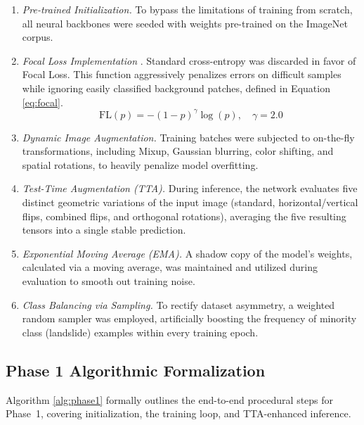\documentclass[12pt,a4paper]{report}
\begin{document}
\begin{enumerate}
    \item \textit{Pre-trained Initialization.} To bypass the limitations of training from scratch, all neural backbones were seeded with weights pre-trained on the ImageNet corpus.
    \item \textit{Focal Loss Implementation} \cite{lin2017focal}. Standard cross-entropy was discarded in favor of Focal Loss. This function aggressively penalizes errors on difficult samples while ignoring easily classified background patches, defined in Equation \ref{eq:focal}.
    \begin{equation}
    \text{FL}(p) = -(1-p)^\gamma \log(p), \quad \gamma = 2.0
    \label{eq:focal}
    \end{equation}
    \item \textit{Dynamic Image Augmentation.} Training batches were subjected to on-the-fly transformations, including Mixup, Gaussian blurring, color shifting, and spatial rotations, to heavily penalize model overfitting.
    \item \textit{Test-Time Augmentation (TTA).} During inference, the network evaluates five distinct geometric variations of the input image (standard, horizontal/vertical flips, combined flips, and orthogonal rotations), averaging the five resulting tensors into a single stable prediction.
    \item \textit{Exponential Moving Average (EMA).} A shadow copy of the model's weights, calculated via a moving average, was maintained and utilized during evaluation to smooth out training noise.
    \item \textit{Class Balancing via Sampling.} To rectify dataset asymmetry, a weighted random sampler was employed, artificially boosting the frequency of minority class (landslide) examples within every training epoch.
\end{enumerate}

\subsection{Phase 1 Algorithmic Formalization}
Algorithm \ref{alg:phase1} formally outlines the end-to-end procedural steps for Phase~1, covering initialization, the training loop, and TTA-enhanced inference.
\end{document}
